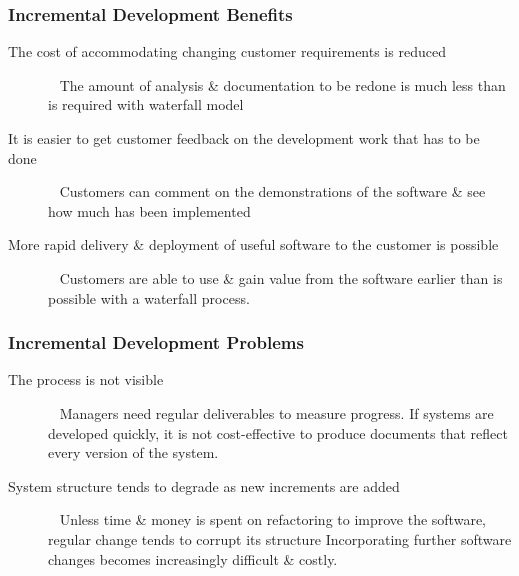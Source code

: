 \documentclass{report}
\begin{document}
\subsubsection{Incremental Development Benefits}
\begin{description}
  \item [The cost of accommodating changing customer requirements is reduced] \ \newline
  The amount of analysis \& documentation to be redone is much less than is required with waterfall model
  \item [It is easier to get customer feedback on the development work that has to be done] \ \newline
  Customers can comment on the demonstrations of the software \& see how much has been implemented
  \item [More rapid delivery \& deployment of useful software to the customer is possible] \ \newline
  Customers are able to use \& gain value from the software earlier than is possible with a waterfall process.
\end{description}


\subsubsection{Incremental Development Problems}
\begin{description}
  \item [The process is not visible] \ \newline
  Managers need regular deliverables to measure progress. If systems are developed quickly, it is not cost-effective to produce documents that reflect every version of the system.
  \item [System structure tends to degrade as new increments are added] \ \newline
  Unless time \& money is spent on refactoring to improve the software, regular change tends to corrupt its structure\newline
  Incorporating further software changes becomes increasingly difficult \& costly.
\end{description}
\end{document}

